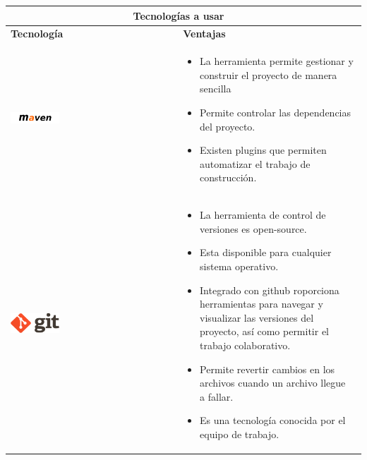   \newpage
    \begin{table}[b!]
    \centering
    \vspace{33mm}
      \begin{tabular}{|p{2cm}|ll}
        \hline
        \multicolumn{2}{|c|}{{\bf Tecnologías a usar}} \\ 
        \hline
          \multicolumn{1}{|p{4cm}|}{{\bf Tecnología}} & 
		  \multicolumn{1}{p{10cm}|}{{\bf Ventajas}}\\
        \hline
          \multicolumn{1}{|p{5cm}|}{\includegraphics[width=0.3\textwidth]{images/maven}} & 
          \multicolumn{2}{p{10cm}|}{\begin{itemize}
          \vspace{-5mm}
         \item La herramienta permite gestionar y construir el proyecto de manera sencilla
         \item Permite controlar las dependencias del proyecto.
         \item Existen plugins que permiten automatizar el trabajo de construcción.
      \end{itemize}} \\
        \hline
          \multicolumn{1}{|p{5cm}|}{\includegraphics[width=0.3\textwidth]{images/git}} & 
          \multicolumn{1}{p{10cm}|}{
          \begin{itemize}
          \vspace{-15mm}
        \item La herramienta de control de versiones es open-source.
        \item Esta disponible para cualquier sistema operativo.
		    \item Integrado con github roporciona herramientas para navegar y visualizar las versiones del proyecto, así como permitir el trabajo colaborativo.
		    \item Permite revertir cambios en los archivos cuando un archivo llegue a fallar.
        \item Es una tecnología conocida por el equipo de trabajo.
      \end{itemize}} \\ 
      
        \hline
      \end{tabular}
      \label{table: tecnologias usadas}
    \end{table}


